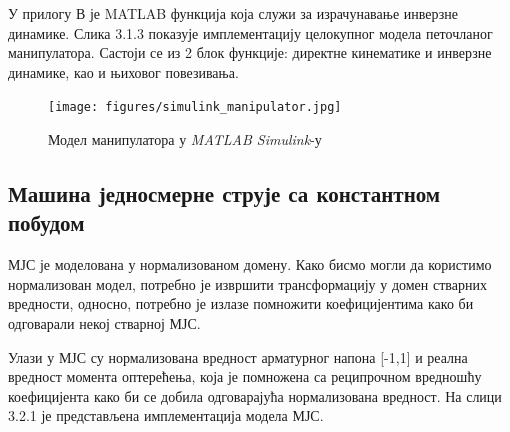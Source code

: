 \documentclass[12pt]{article}
\begin{document}
У прилогу В је MATLAB функција која служи за израчунавање инверзне динамике.
Слика 3.1.3 показује имплементацију целокупног модела петочланог манипулатора. Састоји се из 2 блок функције: директне кинематике и инверзне динамике, као и њиховог повезивања.

\begin{figure}[H]
    \centering
    \texttt{[image: figures/simulink\_manipulator.jpg]}
    \caption{Модел манипулатора у \textit{MATLAB Simulink}-у}
    \label{fig:манипулатор_simulink}
\end{figure}

\subsection{Машина једносмерне струје са константном побудом}
МЈС је моделована у нормализованом домену. Како бисмо могли да користимо нормализован модел, потребно је извршити трансформацију у домен стварних вредности, односно, потребно је излазе помножити коефицијентима како би одговарали некој стварној МЈС.

Улази у МЈС су нормализована вредност арматурног напона [-1,1] и реална вредност момента оптерећења, која је помножена са реципрочном вредношћу коефицијента како би се добила одговарајућа нормализована вредност. На слици 3.2.1 је представљена имплементација модела МЈС.
\end{document}
